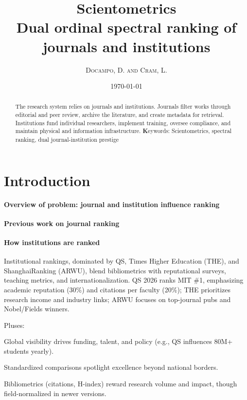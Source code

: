 \documentclass[10pt]{article}
\title{\vspace{-2cm} \flushleft \normalsize Scientometrics\\[1cm]
\large\bfseries\center Dual ordinal spectral ranking of journals and institutions}
\date{\today}
\author{\textsc{Docampo, D. and Cram, L.}}
\begin{document}
\maketitle

\begin{abstract}
The research system relies on journals and institutions. Journals filter works through editorial and peer review, archive the literature, and create metadata for retrieval. Institutions fund individual researchers, implement training, oversee compliance, and maintain physical and information infrastructure. 
{\textbf Keywords}: Scientometrics, spectral ranking, dual journal-institution prestige
\end{abstract}

\section{Introduction}

\paragraph{Overview of problem: journal and institution influence ranking}


\paragraph{Previous work on journal ranking}


\paragraph{How institutions are ranked}
Institutional rankings, dominated by QS, Times Higher Education (THE), and ShanghaiRanking (ARWU), blend bibliometrics with reputational surveys, teaching metrics, and internationalization. QS 2026 ranks MIT \#1, emphasizing academic reputation (30\%) and citations per faculty (20\%); THE prioritizes research income and industry links; ARWU focuses on top-journal pubs and Nobel/Fields winners.

Pluses:

Global visibility drives funding, talent, and policy (e.g., QS influences 80M+ students yearly).

Standardized comparisons spotlight excellence beyond national borders.

Bibliometrics (citations, H-index) reward research volume and impact, though field-normalized in newer versions.
\end{document}
